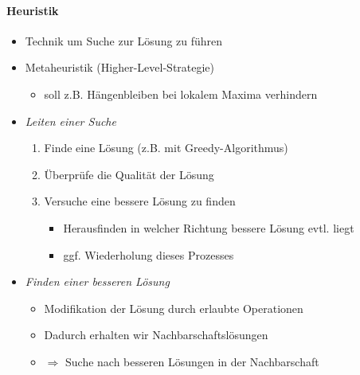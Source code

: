 \documentclass[
    ngerman,
    color=3b,
    load_common, %
    summary,
    boxarc,
]{rubos-tuda-template}
\begin{document}
\paragraph{Heuristik}
\begin{itemize}
    \item Technik um Suche zur Lösung zu führen
    \item Metaheuristik (Higher-Level-Strategie)
          \begin{itemize}
              \item soll z.B. Hängenbleiben bei lokalem Maxima verhindern
          \end{itemize}
    \item \textit{Leiten einer Suche}
          \begin{enumerate}
              \item Finde eine Lösung (z.B. mit Greedy-Algorithmus)
              \item Überprüfe die Qualität der Lösung
              \item Versuche eine bessere Lösung zu finden
                    \begin{itemize}
                        \item Herausfinden in welcher Richtung bessere Lösung evtl. liegt
                        \item ggf. Wiederholung dieses Prozesses
                    \end{itemize}
          \end{enumerate}
    \item \textit{Finden einer besseren Lösung}
          \begin{itemize}
              \item Modifikation der Lösung durch erlaubte Operationen
              \item Dadurch erhalten wir Nachbarschaftslösungen
              \item[] $\Rightarrow$ Suche nach besseren Lösungen in der Nachbarschaft
          \end{itemize}
\end{itemize}
\clearpage
\end{document}
